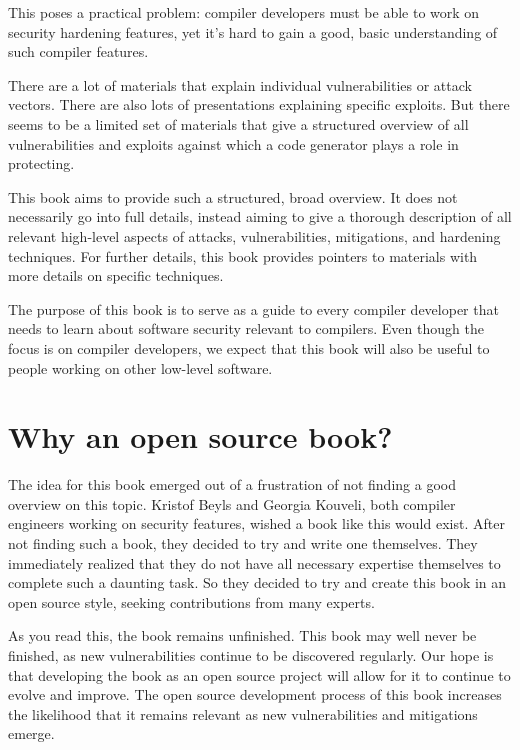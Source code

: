 \documentclass[
  a4paper,
]{report}
\begin{document}
This poses a practical problem: compiler developers must be able to work
on security hardening features, yet it's hard to gain a good, basic
understanding of such compiler features.

There are a lot of materials that explain individual vulnerabilities or
attack vectors. There are also lots of presentations explaining specific
exploits. But there seems to be a limited set of materials that give a
structured overview of all vulnerabilities and exploits against which a
code generator plays a role in protecting.

This book aims to provide such a structured, broad overview. It does not
necessarily go into full details, instead aiming to give a thorough
description of all relevant high-level aspects of attacks,
vulnerabilities, mitigations, and hardening techniques. For further
details, this book provides pointers to materials with more details on
specific techniques.

The purpose of this book is to serve as a guide to every compiler
developer that needs to learn about software security relevant to
compilers. Even though the focus is on compiler developers, we expect
that this book will also be useful to people working on other low-level
software.

\section{Why an open source book?}\label{why-an-open-source-book}

The idea for this book emerged out of a frustration of not finding a
good overview on this topic. Kristof Beyls and Georgia Kouveli, both
compiler engineers working on security features, wished a book like this
would exist. After not finding such a book, they decided to try and
write one themselves. They immediately realized that they do not have
all necessary expertise themselves to complete such a daunting task. So
they decided to try and create this book in an open source style,
seeking contributions from many experts.

As you read this, the book remains unfinished. This book may well never
be finished, as new vulnerabilities continue to be discovered regularly.
Our hope is that developing the book as an open source project will
allow for it to continue to evolve and improve. The open source
development process of this book increases the likelihood that it
remains relevant as new vulnerabilities and mitigations emerge.
\end{document}
